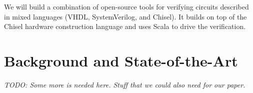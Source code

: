 \documentclass[fleqn,12pt]{article}
\newcommand{\todo}[1]{{\it TODO: #1}}
\begin{document}
We will build a combination of open-source tools for verifying
circuits described in mixed languages (VHDL, SystemVerilog, and Chisel).
It builds on top of the Chisel hardware construction language and uses Scala to drive the verification. 



\section{Background and State-of-the-Art}
\label{sec:background}

\todo{Some more is needed here. Stuff that we could also need for our paper.}
\end{document}
